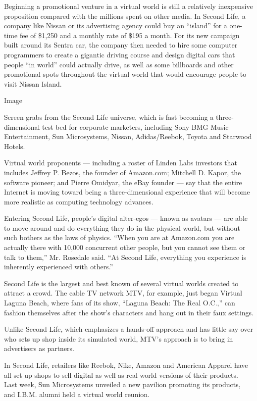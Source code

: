 Beginning a promotional venture in a virtual world is still a relatively
inexpensive proposition compared with the millions spent on other media.
In Second Life, a company like Nissan or its advertising agency could
buy an ``island'' for a one-time fee of \$1,250 and a monthly rate of
\$195 a month. For its new campaign built around its Sentra car, the
company then needed to hire some computer programmers to create a
gigantic driving course and design digital cars that people ``in world''
could actually drive, as well as some billboards and other promotional
spots throughout the virtual world that would encourage people to visit
Nissan Island.

Image

Screen grabs from the Second Life universe, which is fast becoming a
three-dimensional test bed for corporate marketers, including Sony BMG
Music Entertainment, Sun Microsystems, Nissan, Adidas/Reebok, Toyota and
Starwood Hotels.

Virtual world proponents --- including a roster of Linden Labs investors
that includes Jeffrey P. Bezos, the founder of Amazon.com; Mitchell D.
Kapor, the software pioneer; and Pierre Omidyar, the eBay founder ---
say that the entire Internet is moving toward being a three-dimensional
experience that will become more realistic as computing technology
advances.

Entering Second Life, people's digital alter-egos --- known as avatars
--- are able to move around and do everything they do in the physical
world, but without such bothers as the laws of physics. ``When you are
at Amazon.com you are actually there with 10,000 concurrent other
people, but you cannot see them or talk to them,'' Mr. Rosedale said.
``At Second Life, everything you experience is inherently experienced
with others.''

Second Life is the largest and best known of several virtual worlds
created to attract a crowd. The cable TV network MTV, for example, just
began Virtual Laguna Beach, where fans of its show, ``Laguna Beach: The
Real O.C.,'' can fashion themselves after the show's characters and hang
out in their faux settings.

Unlike Second Life, which emphasizes a hands-off approach and has little
say over who sets up shop inside its simulated world, MTV's approach is
to bring in advertisers as partners.

In Second Life, retailers like Reebok, Nike, Amazon and American Apparel
have all set up shops to sell digital as well as real world versions of
their products. Last week, Sun Microsystems unveiled a new pavilion
promoting its products, and I.B.M. alumni held a virtual world reunion.

